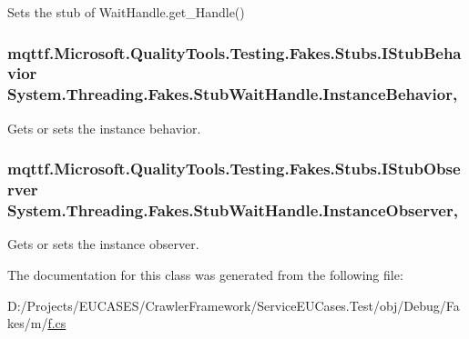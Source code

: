 Sets the stub of Wait\-Handle.\-get\-\_\-\-Handle()

\hypertarget{class_system_1_1_threading_1_1_fakes_1_1_stub_wait_handle_a1401e98871a69608a9f346ba77341dd2}{
\subsubsection[{Instance\-Behavior}]{\setlength{\rightskip}{0pt plus 5cm}mqttf.\-Microsoft.\-Quality\-Tools.\-Testing.\-Fakes.\-Stubs.\-I\-Stub\-Behavior System.\-Threading.\-Fakes.\-Stub\-Wait\-Handle.\-Instance\-Behavior\hspace{0.3cm}{\ttfamily [get]}, {\ttfamily [set]}}}\label{class_system_1_1_threading_1_1_fakes_1_1_stub_wait_handle_a1401e98871a69608a9f346ba77341dd2}


Gets or sets the instance behavior.

\hypertarget{class_system_1_1_threading_1_1_fakes_1_1_stub_wait_handle_a69ff162db28882273381a95f56d86d78}{
\subsubsection[{Instance\-Observer}]{\setlength{\rightskip}{0pt plus 5cm}mqttf.\-Microsoft.\-Quality\-Tools.\-Testing.\-Fakes.\-Stubs.\-I\-Stub\-Observer System.\-Threading.\-Fakes.\-Stub\-Wait\-Handle.\-Instance\-Observer\hspace{0.3cm}{\ttfamily [get]}, {\ttfamily [set]}}}\label{class_system_1_1_threading_1_1_fakes_1_1_stub_wait_handle_a69ff162db28882273381a95f56d86d78}


Gets or sets the instance observer.



The documentation for this class was generated from the following file\-:\begin{DoxyCompactItemize}
\item 
D\-:/\-Projects/\-E\-U\-C\-A\-S\-E\-S/\-Crawler\-Framework/\-Service\-E\-U\-Cases.\-Test/obj/\-Debug/\-Fakes/m/\hyperlink{m_2f_8cs}{f.\-cs}\end{DoxyCompactItemize}

